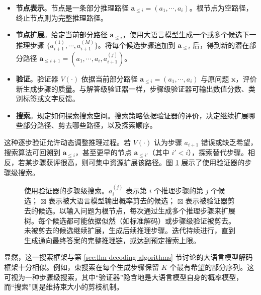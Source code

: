 \begin{itemize}
\item \vspace{0.5em} \textbf{节点表示}。节点是一条部分推理路径 $\mathbf{a}_{\le i} = (a_1,\cdots,a_i)$。根节点为空路径，终止节点则为完整推理路径。
\item \vspace{0.3em} \textbf{节点扩展}。给定当前部分路径 $\mathbf{a}_{\le i}$，使用大语言模型生成一个或多个候选下一推理步骤 $\{a_{i+1}^{(1)},\cdots,a_{i+1}^{(M)}\}$。将每个候选步骤追加到 $\mathbf{a}_{\le i}$ 后，得到新的潜在部分路径 $\mathbf{a}_{\le i + 1} = (a_1,\cdots,a_i,a_{i+1}^{(j)})$。
\item \vspace{0.3em} \textbf{验证}。验证器 $V(\cdot)$ 依据当前部分路径 $\mathbf{a}_{\le i} = (a_1,\cdots,a_i)$ 与原问题 $\mathbf{x}$，评价新生成步骤的质量。与解答级验证器一样，步骤级验证器可输出数值分数、类别标签或文字反馈。
\item \vspace{0.3em} \textbf{搜索}。规定如何探索搜索空间。搜索策略依据验证器的评价，决定继续扩展哪些部分路径、剪去哪些路径，以及探索顺序。
\end{itemize}
\vspace{0.5em}

这种逐步验证允许动态调整推理过程。若 $V(\cdot)$ 认为步骤 $a_{i+1}$ 错误或缺乏希望，搜索算法可回溯到 $\mathbf{a}_{\le i}$，甚至更早的节点 $\mathbf{a}_{\le i'}$（其中 $i' < i$），探索替代步骤。相反，若某步骤获评很高，则可集中资源扩展该路径。图 \ref{fig:step-level-search-with-verifiers} 展示了使用验证器的步骤级搜索。

\begin{figure}[!t]
\centering

\vspace{-0.5cm} \caption{使用验证器的步骤级搜索。$a_{i}^{(j)}$ 表示第 $i$ 个推理步骤的第 $j$ 个候选；{\color{blue} $\boxtimes$} 表示被大语言模型输出概率剪去的候选；{\color{ugreen} $\boxtimes$} 表示被验证器剪去的候选。以输入问题为根节点，每次通过生成多个推理步骤来扩展树。每个候选都可能依据似然（如标准解码）或步骤级验证被剪去。未被剪去的候选继续扩展，生成后续推理步骤。迭代持续进行，直到生成通向最终答案的完整推理链，或达到预定搜索上限。}
\label{fig:step-level-search-with-verifiers}
\end{figure}

显然，这一搜索框架与第 \ref{sec:llm-decoding-algorithms} 节讨论的大语言模型解码框架十分相似。例如，束搜索在每个生成步骤保留 $K$ 个最有希望的部分序列。这可视为一种步骤级搜索，其中“验证器”隐含地是大语言模型自身的概率模型，而“搜索”则是维持束大小的剪枝机制。

